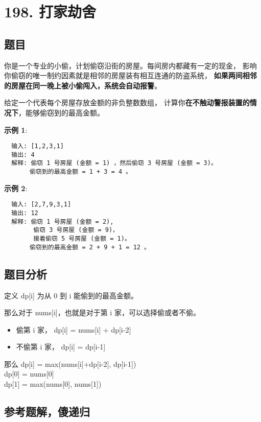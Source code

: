 \newpage
\section{198. 打家劫舍}
\label{leetcode:198}

\subsection{题目}

你是一个专业的小偷，计划偷窃沿街的房屋。每间房内都藏有一定的现金，
影响你偷窃的唯一制约因素就是相邻的房屋装有相互连通的防盗系统，
\textbf{如果两间相邻的房屋在同一晚上被小偷闯入，系统会自动报警}。

给定一个代表每个房屋存放金额的非负整数数组，
计算你\textbf{在不触动警报装置的情况下}，能够偷窃到的最高金额。

\textbf{示例 1}:

\begin{verbatim}
  输入: [1,2,3,1]
  输出: 4
  解释: 偷窃 1 号房屋 (金额 = 1) ，然后偷窃 3 号房屋 (金额 = 3)。
       偷窃到的最高金额 = 1 + 3 = 4 。
\end{verbatim}

\textbf{示例 2}:

\begin{verbatim}
  输入: [2,7,9,3,1]
  输出: 12
  解释: 偷窃 1 号房屋 (金额 = 2),
        偷窃 3 号房屋 (金额 = 9)，
        接着偷窃 5 号房屋 (金额 = 1)。
       偷窃到的最高金额 = 2 + 9 + 1 = 12 。
\end{verbatim}

\subsection{题目分析}

定义 dp[i] 为从 0 到 i 能偷到的最高金额。

那么对于 nums[i]，也就是对于第 i 家，可以选择偷或者不偷。

\begin{itemize}
  \item 偷第 i 家， dp[i] = nums[i] + dp[i-2]
  \item 不偷第 i 家， dp[i] = dp[i-1]
\end{itemize}

那么 dp[i] = max(nums[i]+dp[i-2], dp[i-1]) \\
dp[0] = nums[0] \\
dp[1] = max(nums[0], nums[1])

\subsection{参考题解，傻递归}

